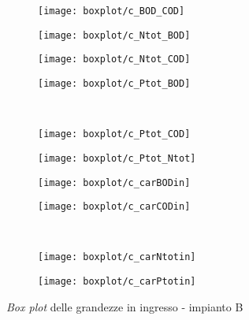 \begin{figure}[h]
\begin{subfigure}{0.24\textwidth}
		\texttt{[image: boxplot/c\_BOD\_COD]}	\centering
	\end{subfigure}
	\begin{subfigure}{0.24\textwidth}
		\texttt{[image: boxplot/c\_Ntot\_BOD]}	\centering
	\end{subfigure}
	\begin{subfigure}{0.24\textwidth}
		\texttt{[image: boxplot/c\_Ntot\_COD]}	\centering
	\end{subfigure}
	\begin{subfigure}{0.24\textwidth}
		\texttt{[image: boxplot/c\_Ptot\_BOD]}	\centering
	\end{subfigure}
	\\[1ex]
	\begin{subfigure}{0.24\textwidth}
		\texttt{[image: boxplot/c\_Ptot\_COD]}	\centering
	\end{subfigure}
	\begin{subfigure}{0.24\textwidth}
		\texttt{[image: boxplot/c\_Ptot\_Ntot]}	\centering
	\end{subfigure}
	\begin{subfigure}{0.24\textwidth}
		\texttt{[image: boxplot/c\_carBODin]}	\centering
	\end{subfigure}
	\begin{subfigure}{0.24\textwidth}
		\texttt{[image: boxplot/c\_carCODin]}	\centering
	\end{subfigure}
	\\[1ex]
	\begin{subfigure}{0.24\textwidth}
		\texttt{[image: boxplot/c\_carNtotin]}	\centering
	\end{subfigure}
	\begin{subfigure}{0.24\textwidth}
		\texttt{[image: boxplot/c\_carPtotin]}	\centering
	\end{subfigure}
	\caption{\textit{Box plot} delle grandezze in ingresso - impianto B}
	\label{fig:c_boxplotin}
\end{figure}

